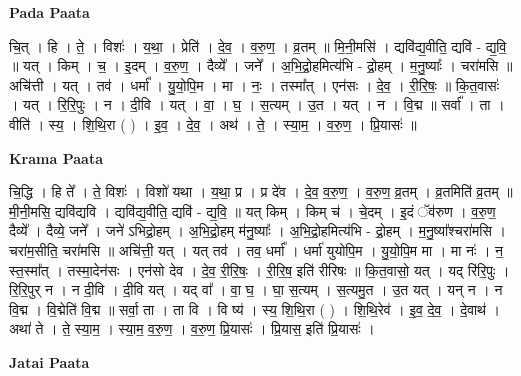 \documentclass[17pt]{extarticle}
\begin{document}
\textbf{Pada Paata} \newline

चि॒त् । हि । ते॒ । विशः॑ । य॒था॒ । प्रेति॑ । दे॒व॒ । व॒रु॒ण॒ । व्र॒तम् ॥ मि॒नी॒मसि॑ । द्यवि॑द्य॒वीति॒ द्यवि॑ - द्य॒वि॒ ॥ यत् । किम् । च॒ । इ॒दम् । व॒रु॒ण॒ । दैव्ये᳚ । जने᳚ । अ॒भि॒द्रो॒हमित्य॑भि - द्रो॒हम् । म॒नु॒ष्याः᳚ । चरा॑मसि ॥ अचि॑त्ती । यत् । तव॑ । धर्मा᳚ । यु॒यो॒पि॒म । मा । नः॒ । तस्मा᳚त् । एन॑सः । दे॒व॒ । री॒रि॒षः॒ ॥ कि॒त॒वासः॑ । यत् । रि॒रि॒पुः । न । दी॒वि । यत् । वा॒ । घ॒ । स॒त्यम् । उ॒त । यत् । न । वि॒द्म ॥ सर्वा᳚ । ता । वीति॑ । स्य॒ । शि॒थि॒रा ( ) । इ॒व॒ । दे॒व॒ । अथ॑ । ते॒ । स्या॒म॒ । व॒रु॒ण॒ । प्रि॒यासः॑ ॥  \newline


\textbf{Krama Paata} \newline

चि॒द्धि । हि ते᳚ । ते॒ विशः॑ । विशो॑ यथा । य॒था॒ प्र । प्र दे॑व । दे॒व॒ व॒रु॒ण॒ । व॒रु॒ण॒ व्र॒तम् । व्र॒तमिति॑ व्र॒तम् ॥ मी॒नी॒मसि॒ द्यवि॑द्यवि । द्यवि॑द्य॒वीति॒ द्यवि॑ - द्य॒वि॒ ॥ यत् किम् । किम् च॑ । चे॒दम् । इ॒दं ॅव॑रुण । व॒रु॒ण॒ दैव्ये᳚ । दैव्ये॒ जने᳚ । जने॑ ऽभिद्रो॒हम् । अ॒भि॒द्रो॒हम् म॑नु॒ष्याः᳚ । अ॒भि॒द्रो॒हमित्य॑भि - द्रो॒हम् । म॒नु॒ष्या᳚श्चरा॑मसि । चरा॑म॒सीति॒ चरा॑मसि ॥ अचि॑त्ती॒ यत् । यत् तव॑ । तव॒ धर्मा᳚ । धर्मा॑ युयोपि॒म । यु॒यो॒पि॒म मा । मा नः॑ । न॒ स्त॒स्मा᳚त् । तस्मा॒देन॑सः । एन॑सो देव । दे॒व॒ री॒रि॒षः॒ । री॒रि॒ष॒ इति॑ रीरिषः ॥ कि॒त॒वासो॒ यत् । यद् रि॑रि॒पुः । रि॒रि॒पुर् न । न दी॒वि । दी॒वि यत् । यद् वा᳚ । वा॒ घ॒ । घा॒ स॒त्यम् । स॒त्यमु॒त । उ॒त यत् । यन् न । न वि॒द्म । वि॒द्मेति॑ वि॒द्म ॥ सर्वा॒ ता । ता वि । वि ष्य॑ । स्य॒ शि॒थि॒रा ( ) । शि॒थि॒रेव॑ । इ॒व॒ दे॒व॒ । दे॒वाथ॑ । अथा॑ ते । ते॒ स्या॒म॒ । स्या॒म॒ व॒रु॒ण॒ । व॒रु॒ण॒ प्रि॒यासः॑ । प्रि॒यास॒ इति॑ प्रि॒यासः॑ । \newline

\textbf{Jatai Paata} \newline
\end{document}
